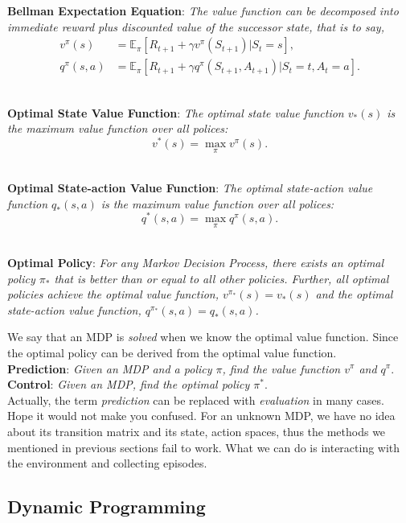 \documentclass{progartcn}
\begin{document}
		\textbf{Bellman Expectation Equation}: \textit{The value function can be decomposed into immediate reward plus discounted value of the successor state, that is to say,}
		\[\begin{split}
		v^\pi(s)&=\mathbb{E}_\pi[R_{t+1}+\gamma v^\pi(S_{t+1})|S_t=s],\\
		q^\pi(s,a)&=\mathbb{E}_\pi[R_{t+1}+\gamma q^\pi(S_{t+1}, A_{t+1})|S_t=t,A_t=a].
		\end{split}
		\]\

		\textbf{Optimal State Value Function}: \textit{The optimal state value function $v_\ast(s)$ is the maximum value function over all polices:}
		\[v^\ast(s)=\max_\pi v^\pi(s).\]\

		\textbf{Optimal State-action Value Function}: \textit{The optimal state-action value function $q_\ast(s,a)$ is the maximum value function over all polices:}
		\[q^\ast(s,a)=\max_\pi q^\pi(s,a).\]\

		\textbf{Optimal Policy}: \textit{For any Markov Decision Process, there exists an optimal policy $\pi_\ast$ that is better than or equal to all other policies. Further, all optimal policies achieve the optimal value function, $v^{\pi_\ast}(s)=v_\ast(s)$ and the optimal state-action value function, $q^{\pi_\ast}(s,a)=q_\ast(s,a)$.}

		We say that an MDP is \textit{solved} when we know the optimal value function. Since the optimal policy can be derived from the optimal value function.\\

		\textbf{Prediction}: \textit{Given an MDP and a policy $\pi$, find the value function $v^\pi$ and $q^\pi$}.\\

		\textbf{Control}: \textit{Given an MDP, find the optimal policy $\pi^\ast$}.\\

		Actually, the term \textit{prediction} can be replaced with \textit{evaluation} in many cases. Hope it would not make you confused. For an unknown MDP, we have no idea about its transition matrix and its state, action spaces, thus the methods we mentioned in previous sections fail to work. What we can do is interacting with the environment and collecting episodes.\\

	\subsection{Dynamic Programming}
\end{document}
